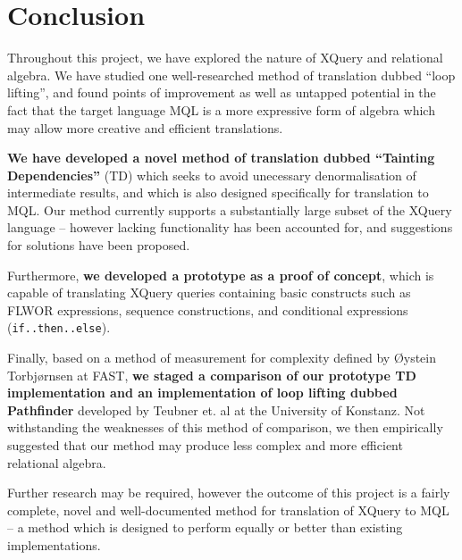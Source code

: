 \chapter{Conclusion}
\label{chapter:conclusion}
Throughout this project, we have explored the nature of XQuery and relational
algebra. We have studied one well-researched method of translation dubbed ``loop
lifting'', and found points of improvement as well as untapped potential in the
fact that the target language MQL is a more expressive form of algebra
which may allow more creative and efficient translations.

\textbf{We have developed a novel method of translation dubbed ``Tainting
Dependencies''} (TD) which seeks to avoid unecessary denormalisation of
intermediate results, and which is also designed specifically for translation
to MQL. Our method currently supports a substantially large subset of the XQuery
language -- however lacking functionality has been accounted for, and suggestions for
solutions have been proposed.

Furthermore, \textbf{we developed a prototype as a proof of concept}, which is
capable of translating XQuery queries containing basic constructs such as FLWOR
expressions, sequence constructions, and conditional expressions
(\texttt{if..then..else}).

Finally, based on a method of measurement for complexity defined by \O ystein
Torbj\o rnsen at FAST, \textbf{we staged a comparison of our prototype TD
implementation and an implementation of loop lifting dubbed Pathfinder}
developed by Teubner et. al at the University of Konstanz. Not withstanding the
weaknesses of this method of comparison, we then empirically suggested that
our method may produce less complex and more efficient relational algebra.

Further research may be required, however the outcome of this project is a
fairly complete, novel and well-documented method for translation of XQuery to
MQL -- a method which is designed to perform equally or better than existing
implementations.

% 
